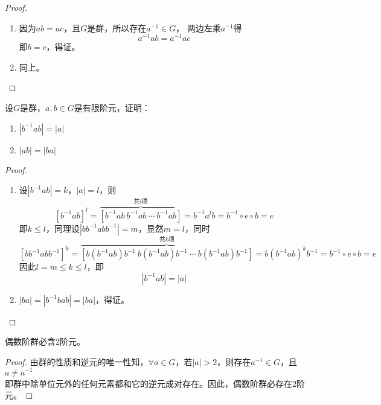 \begin{proof}

    \begin{enumerate}

        \item 
            因为$ab = ac$，且$G$是群，所以存在$a^{-1} \in G$， 两边左乘$a^{-1}$得
            $$a^{-1} ab = a^{-1}ac$$
            即$b = c$，得证。

        \item 同上。
        
    \end{enumerate}

\end{proof}

\begin{proposition}

    设$G$是群，$a,b\in G$是有限阶元，证明：

    \begin{enumerate}

        \item $|b^{-1}ab| = |a|$
        
        \item $|ab| = |ba|$
        
    \end{enumerate}

\end{proposition}

\begin{proof}

    \begin{enumerate}

        \item 
            设$|b^{-1}ab| = k$，$|a| = l$，则
            $$[b^{-1}ab]^l = \overbrace{[b^{-1}ab \  b^{-1}ab \ \cdots \  b^{-1}ab]}^{共l项} = b^{-1}a^{l}b = b^{-1}\circ e \circ b = e$$
            即$k \leq l$，同理设$|bb^{-1}abb^{-1}| = m$，显然$m = l$，同时
            $$[bb^{-1}abb^{-1}]^k = \overbrace{[b(b^{-1}ab)b^{-1} \  b(b^{-1}ab)b^{-1} \ \cdots \  b(b^{-1}ab)b^{-1}]}^{共k项} = b(b^{-1}ab)^kb^{-1} = b^{-1}\circ e \circ b = e$$
            因此$l = m \leq k \leq l$，即
            $$|b^{-1}ab| = |a|$$
            
        \item 
            $|ba| = |b^{-1}bab| = |ba|$，得证。
        
    \end{enumerate}

\end{proof}

\begin{proposition}

    偶数阶群必含$2$阶元。

\end{proposition}

\begin{proof}

    由群的性质和逆元的唯一性知，$\forall a \in G$，若$|a| > 2$，则存在$a^{-1} \in G$，且$a \neq a^{-1}$\\
    即群中除单位元外的任何元素都和它的逆元成对存在。因此，偶数阶群必存在$2$阶元。

\end{proof}
